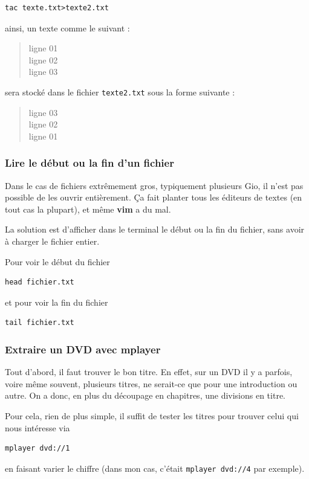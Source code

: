 \documentclass[a4paper,twoside]{article}
\begin{document}
\begin{verbatim}
tac texte.txt>texte2.txt
\end{verbatim}
ainsi, un texte comme le suivant :
\begin{quote}
ligne 01\\
ligne 02\\
ligne 03
\end{quote}

sera stocké dans le fichier \texttt{texte2.txt} sous la forme suivante :

\begin{quote}
ligne 03\\
ligne 02\\
ligne 01
\end{quote}

\subsubsection{Lire le début ou la fin d'un fichier}
Dans le cas de fichiers extrêmement gros, typiquement plusieurs Gio, il n'est pas possible de les ouvrir entièrement. Ça fait planter tous les éditeurs de textes (en tout cas la plupart), et même \textbf{vim} a du mal.

La solution est d'afficher dans le terminal le début ou la fin du fichier, sans avoir à charger le fichier entier. 

Pour voir le début du fichier
\begin{verbatim}
head fichier.txt
\end{verbatim}
et pour voir la fin du fichier
\begin{verbatim}
tail fichier.txt
\end{verbatim}



\subsubsection{Extraire un DVD avec mplayer}
Tout d'abord, il faut trouver le bon titre. En effet, sur un DVD il y a parfois, voire même souvent, plusieurs titres, ne serait-ce que pour une introduction ou autre. On a donc, en plus du découpage en chapitres, une divisions en titre.

Pour cela, rien de plus simple, il suffit de tester les titres pour trouver celui qui nous intéresse via
\begin{verbatim}
mplayer dvd://1
\end{verbatim}
en faisant varier le chiffre (dans mon cas, c'était \verb|mplayer dvd://4| par exemple).
\end{document}
